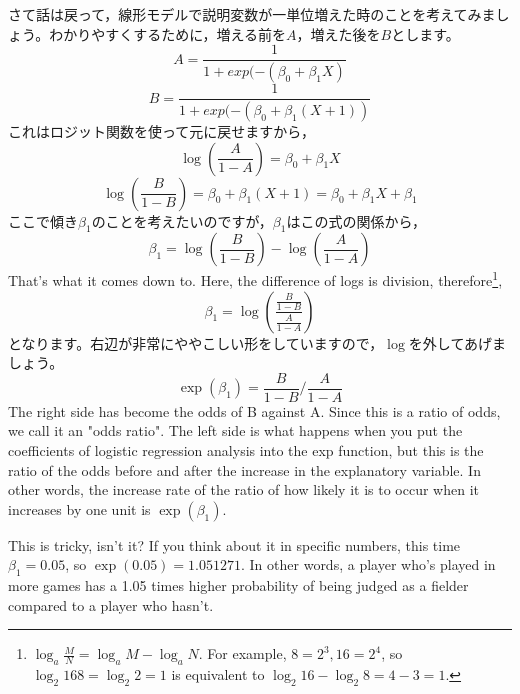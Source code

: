 \documentclass{ltjsbook}
\begin{document}
さて話は戻って，線形モデルで説明変数が一単位増えた時のことを考えてみましょう。わかりやすくするために，増える前を$A$，増えた後を$B$とします。
\[ A = \frac{1}{1+exp(-(\beta_0 + \beta_1X)} \]
\[ B = \frac{1}{1+exp(-(\beta_0 + \beta_1(X+1))} \]
これはロジット関数を使って元に戻せますから，
\[ \log\left( \frac{A}{1-A} \right) = \beta_0 + \beta_1 X \]
\[ \log\left(\frac{B}{1-B} \right)= \beta_0 + \beta_1 (X+1)  = \beta_0 + \beta_1X + \beta_1\]
ここで傾き$\beta_1$のことを考えたいのですが，$\beta_1$はこの式の関係から，
\[ \beta_1 = \log\left(\frac{B}{1-B} \right) - \log\left( \frac{A}{1-A} \right) \]
That's what it comes down to. Here, the difference of logs is division, therefore\footnote{$\log_a \frac{M}{N} = \log_a M-\log_a N$. For example, $8=2^3,16=2^4$, so $\log_2{16}{8} = \log_2 2 = 1$ is equivalent to $\log_2 16 - \log_2 8 = 4 - 3 = 1$.},
\[ \beta_1 = \log\left( \frac{ \frac{B}{1-B} }{ \frac{A}{1-A} } \right) \]
となります。右辺が非常にややこしい形をしていますので，$\log$を外してあげましょう。
\[ \exp(\beta_1) =  \frac{B}{1-B}  \Big/  \frac{A}{1-A}  \]
The right side has become the odds of B against A. Since this is a ratio of odds, we call it an "odds ratio". The left side is what happens when you put the coefficients of logistic regression analysis into the exp function, but this is the ratio of the odds before and after the increase in the explanatory variable. In other words, the increase rate of the ratio of how likely it is to occur when it increases by one unit is $\exp(\beta_1)$.

This is tricky, isn't it? If you think about it in specific numbers, this time $\beta_1=0.05$, so $\exp(0.05)=1.051271$. In other words, a player who's played in more games has a 1.05 times higher probability of being judged as a fielder compared to a player who hasn't.
\end{document}
